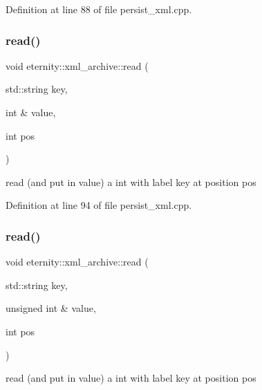Definition at line 88 of file persist\+\_\+xml.\+cpp.

\mbox{\label{classeternity_1_1xml__archive_adbfbeeb5a86ecf4bfccdba1054d9c50a}} 
\subsubsection{\texorpdfstring{read()}{read()}\hspace{0.1cm}{\footnotesize\ttfamily [3/6]}}
{\footnotesize\ttfamily void eternity\+::xml\+\_\+archive\+::read (\begin{DoxyParamCaption}\item[{std\+::string}]{key,  }\item[{int \&}]{value,  }\item[{int}]{pos }\end{DoxyParamCaption})}



read (and put in value) a int with label key at position pos 



Definition at line 94 of file persist\+\_\+xml.\+cpp.

\mbox{\label{classeternity_1_1xml__archive_ab38c114af01eaffade2ab426f73a5575}} 
\subsubsection{\texorpdfstring{read()}{read()}\hspace{0.1cm}{\footnotesize\ttfamily [4/6]}}
{\footnotesize\ttfamily void eternity\+::xml\+\_\+archive\+::read (\begin{DoxyParamCaption}\item[{std\+::string}]{key,  }\item[{unsigned int \&}]{value,  }\item[{int}]{pos }\end{DoxyParamCaption})}



read (and put in value) a int with label key at position pos 



